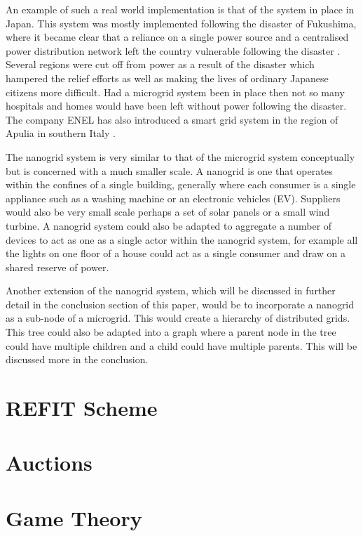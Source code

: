 \documentclass[a4paper, notitlepage]{report}
\begin{document}
An example of such a real world implementation is that of the system in place in
Japan. This system was mostly implemented following the disaster of Fukushima,
where it became clear that a reliance on a single power source and a centralised
power distribution network left the country vulnerable following the disaster
\cite{japan_microgrids}. Several regions were cut off from power as a result of
the disaster which hampered the relief efforts as well as making the lives of
ordinary Japanese citizens more difficult. Had a microgrid system been in place
then not so many hospitals and homes would have been left without power
following the disaster. The company ENEL has also introduced a smart grid system
in the region of Apulia in southern Italy \cite{sapienza2013enel}.  

The nanogrid system is very similar to that of the microgrid system conceptually
but is concerned with a much smaller scale. A nanogrid is one that operates
within the confines of a single building, generally where each consumer is a
single appliance such as a washing machine or an electronic vehicles (EV).
Suppliers would also be very small scale perhaps a set of solar panels or a
small wind turbine. A nanogrid system could also be adapted to aggregate a number
of devices to act as one as a single actor within the nanogrid system, for
example all the lights on one floor of a house could act as a single consumer
and draw on a shared reserve of power.

Another extension of the nanogrid system, which will be discussed in further
detail in the conclusion section of this paper, would be to incorporate a
nanogrid as a sub-node of a microgrid. This would create a hierarchy of
distributed grids. This tree could also be adapted into a graph where a parent
node in the tree could have multiple children and a child could have multiple
parents. This will be discussed more in the conclusion.
\chapter{REFIT Scheme}
\label{sec:orga8f9b21}
\chapter{Auctions}
\label{sec:org6072ba8}
\chapter{Game Theory}
\label{sec:org4edf28a}
\end{document}
